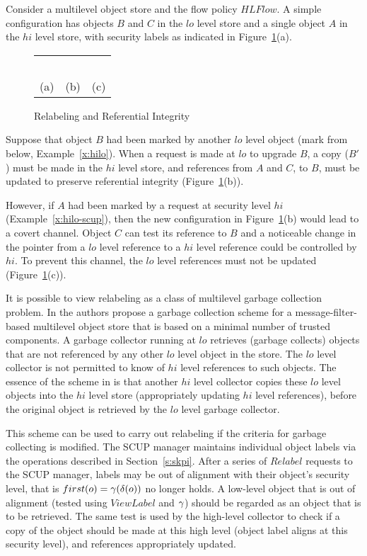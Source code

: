 \begin{ex}
Consider a multilevel object store and the flow policy $HLFlow$. 
A simple configuration has objects
$B$ and $C$ in the $lo$ level store and a single  object $A$ in the $hi$ level
store,  with security labels as indicated in Figure~\ref{f:store}(a).
\begin{figure}[htb]
\begin{center}
\begin{tabular}{ccc}
 & &  ~~\\
 (a)  & (b) & (c)
\end{tabular}
\end{center}
\caption{Relabeling and Referential Integrity\label{f:store}} 
\end{figure}
Suppose that object $B$ had been marked by another $lo$ level object
(mark from below, Example~\ref{x:hilo}). When a request is made 
at $lo$ to upgrade $B$, a copy ($B'$) must be made
in the $hi$ level store, and references from $A$ and $C$, to $B$, 
must be updated  to preserve referential integrity (Figure~\ref{f:store}(b)). 

However, if $A$ had been marked by a request at security level $hi$
(Example~\ref{x:hilo-scup}), then the new configuration in
Figure~\ref{f:store}(b) would lead to a covert channel.  Object $C$ can
test its reference to $B$ and a noticeable change in the pointer from a
$lo$ level reference to a $hi$ level reference could be controlled by
$hi$. To prevent this channel, the $lo$ level references must not be
updated (Figure~\ref{f:store}(c)). 

It is possible to view relabeling as a class of multilevel garbage
collection problem. In \cite{Bertino:94} the authors propose a garbage
collection scheme for a message-filter-based multilevel object store
that is based on a minimal number of trusted components.  A garbage
collector running at $lo$  retrieves (garbage collects) objects that
are not referenced by any other $lo$ level object in the store.  The
$lo$ level collector is not permitted to know of $hi$ level references
to such objects.  The essence of the scheme in \cite{Bertino:94} is
that another $hi$ level collector copies these $lo$ level objects into
the $hi$ level store (appropriately updating $hi$ level references),
before the original object is retrieved by the $lo$ level garbage
collector.

This scheme can be used to carry out relabeling if the criteria for
garbage collecting is modified. The SCUP manager maintains individual
object labels via the operations described in Section~\ref{s:skpi}.
After a series of $Relabel$ requests to the SCUP manager, labels
may be out of alignment with their object's security level, that is
$first(o) = \gamma(\delta(o))$ no longer holds.  A low-level object that
is out of alignment (tested using $ViewLabel$ and $\gamma$) should
be regarded as an object that is to be retrieved.  The same test is
used by the high-level collector to check if a copy of the object
should be made at this high level (object label aligns at this security level),
and references appropriately updated.


\end{ex}
